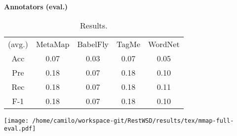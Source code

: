 \begin{center}\textbf{\Large Annotators (eval.)}\end{center}
\begin{center}\begin{table}[p]\centering
\begin{tabular}{ccccc}
(avg.) & MetaMap & BabelFly & TagMe & WordNet\\ 
Acc & 0.07 & 0.03 & 0.07 & 0.05\\ 
Pre & 0.18 & 0.07 & 0.18 & 0.10\\ 
Rec & 0.18 & 0.07 & 0.18 & 0.11\\ 
F-1 & 0.18 & 0.07 & 0.18 & 0.10\\ 

\end{tabular}\caption{Results.}\end{table}\end{center}



\vspace{0.2cm}

\begin{center}
\texttt{[image: /home/camilo/workspace-git/RestWSD/results/tex/mmap-full-eval.pdf]}
\end{center}
\newpage
